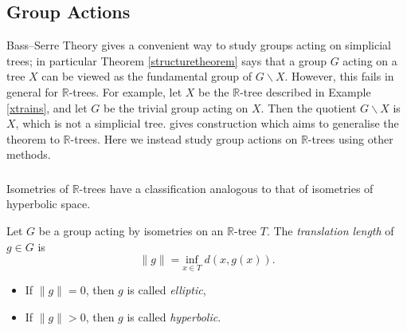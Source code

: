 \subsection{Group Actions}
Bass--Serre Theory gives a convenient way to study groups acting on simplicial trees; in particular Theorem \ref{structuretheorem} says that a group $G$ acting on a tree $X$ can be viewed as the fundamental group of $G\backslash X$. However, this fails in general for $\mathbb{R}$-trees. For example, let $X$ be the $\mathbb{R}$-tree described in Example \ref{xtrains}, and let $G$ be the trivial group acting on $X$. Then the quotient $G\backslash X$ is $X$, which is not a simplicial tree. \cite{Levit_rtrees} gives construction which aims to generalise the theorem to $\mathbb{R}$-trees. Here we instead study group actions on $\mathbb{R}$-trees using other methods.

\subsubsection{} 
Isometries of $\mathbb{R}$-trees have a classification analogous to that of isometries of hyperbolic space. 
\begin{definition}
    Let $G$ be a group acting by isometries on an $\mathbb{R}$-tree $T$. The \emph{translation length} of $g\in G$ is \[\lVert g\rVert=\underset{x\in T}{\text{inf}}\;d(x,g(x)).\]
    \begin{itemize}
        \item If $\lVert g\rVert=0$, then $g$ is called \emph{elliptic},
        \item If $\lVert g\rVert>0$, then $g$ is called \emph{hyperbolic}.
    \end{itemize}
\end{definition}


